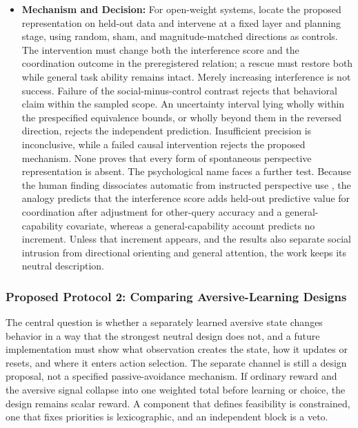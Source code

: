 \documentclass{article}
\begin{document}
\begin{itemize}
    \item \textbf{Mechanism and Decision:} For open-weight systems, locate the proposed representation on held-out data and intervene at a fixed layer and planning stage, using random, sham, and magnitude-matched directions as controls. The intervention must change both the interference score and the coordination outcome in the preregistered relation; a rescue must restore both while general task ability remains intact. Merely increasing interference is not success. Failure of the social-minus-control contrast rejects that behavioral claim within the sampled scope. An uncertainty interval lying wholly within the prespecified equivalence bounds, or wholly beyond them in the reversed direction, rejects the independent prediction. Insufficient precision is inconclusive, while a failed causal intervention rejects the proposed mechanism. None proves that every form of spontaneous perspective representation is absent. The psychological name faces a further test. Because the human finding dissociates automatic from instructed perspective use \citep{ref53}, the analogy predicts that the interference score adds held-out predictive value for coordination after adjustment for other-query accuracy and a general-capability covariate, whereas a general-capability account predicts no increment. Unless that increment appears, and the results also separate social intrusion from directional orienting and general attention, the work keeps its neutral description.
\end{itemize}

\subsubsection{Proposed Protocol 2: Comparing Aversive-Learning Designs}
The central question is whether a separately learned aversive state changes behavior in a way that the strongest neutral design does not, and a future implementation must show what observation creates the state, how it updates or resets, and where it enters action selection. The separate channel is still a design proposal, not a specified passive-avoidance mechanism. If ordinary reward and the aversive signal collapse into one weighted total before learning or choice, the design remains scalar reward. A component that defines feasibility is constrained, one that fixes priorities is lexicographic, and an independent block is a veto.
\end{document}
